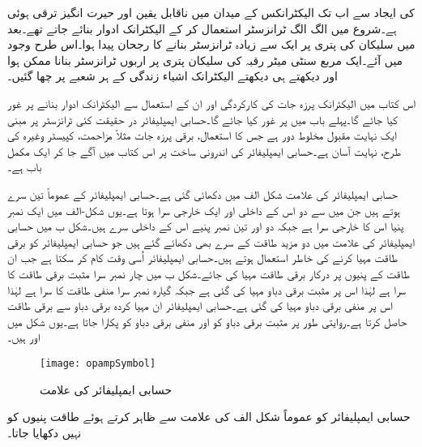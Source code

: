 
  کی ایجاد سے اب تک الیکٹرانکس کے میدان میں ناقابل یقین اور حیرت انگیز ترقی ہوئی ہے۔شروع میں الگ الگ ٹرانزسٹر استعمال کر کے الیکٹرانک ادوار بنائے جاتے تھے۔بعد میں سلیکان کی پتری  پر ایک سے زیادہ ٹرانزسٹر بنانے کا رجحان پیدا ہوا۔اس طرح   وجود میں آئے۔ایک مربع سنٹی میٹر رقبہ کی سلیکان پتری پر اربوں ٹرانزسٹر بنانا ممکن ہوا اور دیکھتے ہی دیکھتے الیکٹرانک اشیاء  زندگی کے ہر شعبے پر چھا گئیں۔

اس کتاب میں الیکٹرانک پرزہ جات کی کارکردگی اور ان کے استعمال سے الیکٹرانک ادوار بنانے پر غور کیا جائے گا۔پہلے باب میں   پر غور کیا جائے گا۔حسابی ایمپلیفائر در حقیقت کئی ٹرانزسٹر پر مبنی ایک نہایت مقبول مخلوط دور ہے جس کا استعمال، برقی پرزہ جات مثلاً مزاحمت، کپیسٹر وغیرہ  کی طرح، نہایت آسان ہے۔حسابی ایمپلیفائر کی اندرونی ساخت پر اس کتاب میں آگے جا کر ایک مکمل باب ہے۔

	
حسابی ایمپلیفائر کی علامت شکل  الف  میں دکھائی گئی ہے۔حسابی ایمپلیفائر کے عموماً تین سرے ہوتے ہیں جن میں سے دو اس کے داخلی اور ایک خارجی سرا ہوتا ہے۔یوں شکل-الف میں ایک نمبر پنیا اس کا خارجی سرا ہے جبکہ دو اور تین نمبر پنیے اس کے داخلی سرے ہیں۔شکل  ب     میں حسابی ایمپلیفائر کی علامت میں دو مزید طاقت کے سرے بھی دکھائے گئے ہیں جو حسابی ایمپلیفائر کو برقی طاقت مہیا کرنے کی خاطر استعمال ہوتے ہیں۔حسابی ایمپلیفائر اُسی وقت کام کر سکتا ہے جب ان طاقت کے پنیوں پر درکار برقی طاقت مہیا کی جائے۔شکل  ب میں چار نمبر سرا مثبت برقی طاقت کا سرا ہے لہٰذا اس  پر مثبت برقی دباو مہیا کی گئی ہے  جبکہ گیارہ نمبر سرا منفی طاقت کا سرا ہے لہٰذا اس  پر منفی برقی دباو مہیا کی گئی ہے۔حسابی ایمپلیفائر ان مہیا کردہ برقی دباو سے برقی طاقت حاصل کرتا ہے۔روایتی طور پر مثبت برقی دباو کو  اور منفی برقی دباو  کو  پکارا جاتا ہے۔یوں شکل میں اور ہیں۔
\begin{figure}
\centering
\texttt{[image: opampSymbol]}
\caption{حسابی ایمپلیفائر کی علامت}
\label{شکل_حسابی_ایمپلیفائر_کی_علامت}
\end{figure}
حسابی ایمپلیفائر کو عموماً شکل  الف کی علامت سے ظاہر کرتے ہوئے طاقت پنیوں کو نہیں دکھایا جاتا۔

